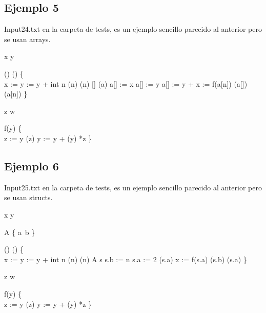 \newpage


\subsection{Ejemplo 5}
Input24.txt en la carpeta de tests, es un ejemplo sencillo parecido al anterior pero se usan arrays.

\begin{algorithm}

	\Integer{} x  \;
	\Integer{} y  \;
	
	\Void() () \{ \\
	\quad x :=  \;
	\quad y := y + \;
	\quad int n\;
	\quad {}(n)\;
	\quad {}(n)\;
	\quad {}[] (a)\;
	\quad a[] := x\;
	\quad a[] := y\;
	\quad a[] := y + \;
	\quad x := f(a[n])\;
	\quad {}(a[])\;
	\quad {}(a[n])\;
	\}\;

 	\Integer{} z \;
	\Integer{} w \;
	
	 f(y) \{ \\
	\quad z := y \;
	\quad {}(z) \;
	\quad y := y +  \;
	\quad {}(y) \;
	\quad {} *z \;
	\}\;
	
\end{algorithm}

\newpage

\subsection{Ejemplo 6}
Input25.txt en la carpeta de tests, es un ejemplo sencillo parecido al anterior pero se usan structs.

\begin{algorithm}

	\Integer{} x  \;
	\Integer{} y  \;
	
	 A \{
		\quad {} a\,
		\quad {} b\;
	\} \;
	
	\Void() () \{ \\
	\quad x :=  \;
	\quad y := y + \;
	\quad int n\;
	\quad {}(n)\;
	\quad {}(n)\;
	\quad {} A s\;
	\quad s.b := n\;
	\quad s.a := 2\;
	\quad {}(s.a)\;
	\quad x := f(s.a)\;
	\quad {}(s.b)\;
	\quad {}(s.a)\;
	\}\;

 	\Integer{} z \;
	\Integer{} w \;
	
	 f(y) \{ \\
	\quad z := y \;
	\quad {}(z) \;
	\quad y := y +  \;
	\quad {}(y) \;
	\quad {} *z \;
	\}\;
	
\end{algorithm}

